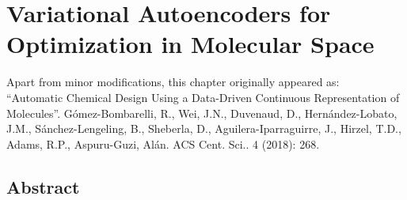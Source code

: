 \chapter{Variational Autoencoders for Optimization in Molecular Space}\label{sec:autoencoder}
\thispagestyle{plain}
\vspace{-.5cm}

\noindent Apart from minor modifications, this chapter originally appeared as:\newline\\
\ssp ``Automatic Chemical Design Using a Data-Driven Continuous Representation of Molecules''.
Gómez-Bombarelli, R., Wei, J.N., Duvenaud, D., Hernández-Lobato, J.M., Sánchez-Lengeling, B., Sheberla, D., Aguilera-Iparraguirre, J., Hirzel, T.D., Adams, R.P., Aspuru-Guzi, Alán. ACS Cent. Sci.. 4 (2018): 268.

\section*{Abstract}
    \dsp
    


